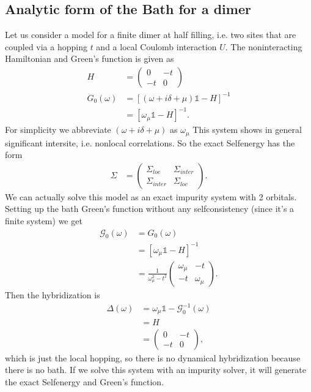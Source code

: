 \documentclass[12pt,a4paper]{scrartcl}
\numberwithin{equation}{section}
\newcommand{\unity}{\mathds{1}}
\begin{document}
\subsection{Analytic form of the Bath for a dimer}
Let us consider a model for a finite dimer at half filling, i.e. two sites that are coupled via a hopping $t$
and a local Coulomb interaction $U$. 
The noninteracting Hamiltonian and Green's function is given as
\begin{align}
 H &= 
 \begin{pmatrix}
  0 & -t \\ -t & 0
 \end{pmatrix} \\
 G_0(\omega) &= \left[(\omega +i\delta + \mu ) \unity -H  \right]^{-1} \\
 &= \left[\omega_{\mu} \unity -H  \right]^{-1} .
\end{align}
For simplicity we abbreviate $(\omega +i\delta + \mu)$ as $\omega_{\mu}$
This system shows in general significant intersite, i.e.
nonlocal correlations. So the exact Selfenergy has the form
\begin{align}
 \Sigma &= 
 \begin{pmatrix}
  \Sigma_{loc} & \Sigma_{inter} \\ \Sigma_{inter} & \Sigma_{loc}
 \end{pmatrix} .
\end{align}
We can actually solve this model as an exact impurity system with 2 orbitals. Setting up
the bath Green's function without any selfconsistency (since it's a finite system) we get
\begin{align}
 \mathcal{G}_0(\omega) &= G_0(\omega) \nonumber \\
 &= \left[\omega_{\mu} \unity -H  \right]^{-1} \nonumber \\ 
 &=\frac{1}{\omega_{\mu}^2-t^2} 
   \begin{pmatrix}
     \omega_{\mu} & -t \\ -t  & \omega_{\mu}
    \end{pmatrix}. 
\end{align}
Then the hybridization is
\begin{align}
 \Delta(\omega) &=\omega_{\mu} \unity - \mathcal{G}^{-1}_0(\omega) \nonumber \\
 &= H \nonumber \\ 
 &=\begin{pmatrix}
  0 & -t \\ -t & 0
 \end{pmatrix},
\end{align}
which is just the local hopping, so there is no dynamical hybridization because there is no bath.
If we solve this system with an impurity solver, it will generate the exact
Selfenergy and Green's function.
\end{document}
